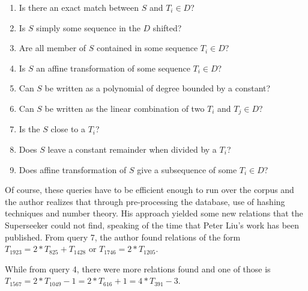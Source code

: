 \begin{appendix}
\begin{enumerate}
\item Is there an exact match between $S$ and $T_i \in D$?
\item Is $S$ simply some sequence in the $D$ shifted?
\item Are all member of $S$ contained in some sequence $T_i \in D$?
\item Is $S$ an affine transformation of some sequence $T_i \in D$?
\item Can $S$ be written as a polynomial of degree bounded by a constant?
\item Can $S$ be written as the linear combination of two $T_i$ and $T_j \in D$?
\item Is the $S$ close to a $T_i$?
\item Does $S$ leave a constant remainder when divided by a $T_i$?
\item Does affine transformation of $S$ give a subsequence of some $T_i \in D$?
\end{enumerate}

Of course, these queries have to be efficient enough to run over the corpus and the author realizes that through
pre-processing the database, use of hashing techniques and number theory. His approach yielded some new relations
that the Superseeker could not find, speaking of the time that Peter Liu's work has been published. From query 7, the
 author found relations of the form $T_{1923} = 2*T_{825} + T_{1428}$ or $T_{1746} = 2*T_{1205}$.

While from query 4, there were more relations found and one of those is $T_{1567} = 2*T_{1049} -1 = 2*T_{616} +1 =
4*T_{391} - 3$.
\end{appendix}

